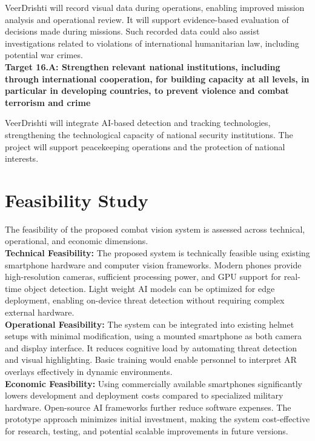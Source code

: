 VeerDrishti will record visual data during operations, enabling improved mission analysis and operational review. It will support evidence-based evaluation of decisions made during missions. Such recorded data could also assist investigations related to violations of international humanitarian law, including potential war crimes. \\

\textbf{Target 16.A: Strengthen relevant national institutions, including through international cooperation, for building capacity at all levels, in particular in developing countries, to prevent violence and combat terrorism and crime} \vspace{3pt}

VeerDrishti will integrate AI-based detection and tracking technologies, strengthening the technological capacity of national security institutions. The project will support peacekeeping operations and the protection of national interests.

\section{Feasibility Study}
The feasibility of the proposed combat vision system is assessed across technical, operational, and economic dimensions. \\

\textbf{Technical Feasibility:}
The proposed system is technically feasible using existing smartphone hardware and computer vision frameworks. Modern phones provide high-resolution cameras, sufficient processing power, and GPU support for real-time object detection. Light weight AI models can be optimized for edge deployment, enabling on-device threat detection without requiring complex external hardware. \\

\textbf{Operational Feasibility:}
The system can be integrated into existing helmet setups with minimal modification, using a mounted smartphone as both camera and display interface. It reduces cognitive load by automating threat detection and visual highlighting. Basic training would enable personnel to interpret AR overlays effectively in dynamic environments. \\

\textbf{Economic Feasibility:}
Using commercially available smartphones significantly lowers development and deployment costs compared to specialized military hardware. Open-source AI frameworks further reduce software expenses. The prototype approach minimizes initial investment, making the system cost-effective for research, testing, and potential scalable improvements in future versions.

